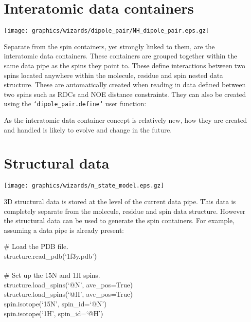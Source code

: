 
\newpage
\section{Interatomic data containers}

\begin{figure*}[h]
\texttt{[image: graphics/wizards/dipole\_pair/NH\_dipole\_pair.eps.gz]}
\end{figure*}

Separate from the spin containers, yet strongly linked to them, are the interatomic data containers.  These containers are grouped together within the same data pipe as the spins they point to.  These define interactions between two spins located anywhere within the molecule, residue and spin nested data structure.  These are automatically created when reading in data defined between two spins such as RDCs and NOE distance constraints.  They can also be created using the \texttt{`dipole\_pair.define'} user function:


As the interatomic data container concept is relatively new, how they are created and handled is likely to evolve and change in the future.



\section{Structural data}

\begin{figure*}[h]
\texttt{[image: graphics/wizards/n\_state\_model.eps.gz]}
\end{figure*}

3D structural data is stored at the level of the current data pipe.  This data is completely separate from the molecule, residue and spin data structure.  However the structural data can be used to generate the spin containers.  For example, assuming a data pipe is already present:

\begin{exampleenv}
\# Load the PDB file. \\
structure.read\_pdb(`1f3y.pdb') \\
 \\
\# Set up the 15N and 1H spins. \\
structure.load\_spins(`@N', ave\_pos=True) \\
structure.load\_spins(`@H', ave\_pos=True) \\
spin.isotope(`15N', spin\_id=`@N') \\
spin.isotope(`1H', spin\_id=`@H')
\end{exampleenv}

